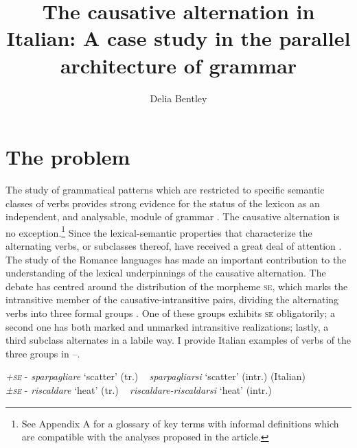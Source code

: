 \documentclass[output=paper,colorlinks,citecolor=brown
]{langscibook}
\author{Delia Bentley\orcid{}\affiliation{University of Manchester}}
\title[The causative alternation in Italian]{The causative alternation in Italian: A case study in the parallel architecture of grammar}
\begin{document}
\maketitle


\section{The problem}
\label{bentley_section_1}
The study of grammatical patterns which are restricted to specific semantic classes of verbs provides strong evidence for the status of the lexicon as an independent, and analysable, module of grammar \citep{pinker1989learnability,pinker2013secret,levin1993english}. The causative alternation is no exception.\footnote{See Appendix A for a glossary of key terms with informal definitions which are compatible with the analyses proposed in the article.}  Since \citet[332–337]{jespersen1927modern} the lexical-semantic properties that characterize the alternating verbs, or subclasses thereof, have received a great deal of attention \citep[etc.]{haspelmath1993more,levin1995unaccusativity,kiparsky1997remarks,chierchia1989semantics,comrie2006transitivity,schafer2009causative,samardzic2012meaning}. The study of the Romance languages has made an important contribution to the understanding of the lexical underpinnings of the causative alternation. The debate has centred around the distribution of the morpheme \textsc{se}, which marks the intransitive member of the causative-intransitive pairs, dividing the alternating verbs into three formal groups \citep[etc.]{zribi1987reflexivite,labelle1992change,alexiadou2006properties, alexiadou2015external, legendre2010french,cennamo2011anticausative,cennamo2012aspectual,kailuweit2012construcciones,martin2014anticausatives,vivanco2021scalar}. One of these groups exhibits \textsc{se} obligatorily; a second one has both marked and unmarked intransitive realizations; lastly, a third subclass alternates in a labile way. I provide Italian examples of verbs of the three groups in --.

\ea
\label{bentley_example_1}
\ea	\label{bentley_example_1a} \textit{\textsc{+\textsc{se}}} - \textit{sparpagliare} ‘scatter’ (tr.) ~ \textit{sparpagliarsi} ‘scatter’ (intr.) 	(Italian) \\

\ex	\label{bentley_example_1b} 
\textit{\textsc{±\textsc{se}}} - \textit{riscaldare} ‘heat’ (tr.) ~ \textit{riscaldare-riscaldarsi} ‘heat’ (intr.)  \\
\end{document}
